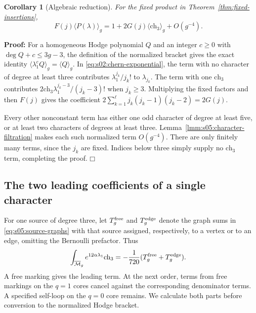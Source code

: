 \documentclass[a4paper,10pt]{article}
\numberwithin{equation}{section}
\newcommand{\MM}{\overline{\mathcal{M}}}
\theoremstyle{paperplain}
\newtheorem{crl}[thm]{Corollary}
\theoremstyle{paperremark}
\theoremstyle{paperplain}
\newenvironment{prf}{\noindent \textbf{Proof: }}{\hfill $\mdlgwhtsquare$\par\addvspace{0.5\baselineskip}}
\begin{document}
\begin{crl}[Algebraic reduction]\label{crl:s05:algebraic-reduction}
For the fixed product in Theorem~\ref{thm:fixed-insertions},
\begin{equation}\label{eq:s05:algebraic-reduction}
 F(j)\langle P(\lambda)\rangle_g
 =1+2G(j)\langle\mathrm{ch}_3\rangle_g+O(g^{-4}).
\end{equation}
\end{crl}
\begin{prf}
For a homogeneous Hodge polynomial $Q$ and an integer $c\geq0$
with $\deg Q+c\leq3g-3$, the definition of the normalized bracket
gives the exact identity
$\langle\lambda_1^c Q\rangle_g=\langle Q\rangle_g$.
In \eqref{eq:s02:chern-exponential}, the term with no character of
degree at least three contributes $\lambda_1^{j_k}/j_k!$ to
$\lambda_{j_k}$. The term with one $\mathrm{ch}_3$ contributes
$2\mathrm{ch}_3\lambda_1^{j_k-3}/(j_k-3)!$ when $j_k\geq3$.
Multiplying the fixed factors and then $F(j)$ gives the coefficient
$2\sum_{k=1}^{\ell}j_k(j_k-1)(j_k-2)=2G(j)$.

Every other nonconstant term has either one odd character of degree
at least five, or at least two characters of degrees at least three.
Lemma~\ref{lmm:s05:character-filtration} makes each such normalized
term $O(g^{-4})$. There are only finitely many terms, since the
$j_k$ are fixed. Indices below three simply supply no
$\mathrm{ch}_3$ term, completing the proof.
\end{prf}

\subsection{The two leading coefficients of a single character}
\label{subsec:s05:02}

For one source of degree three, let $T_g^{\rm free}$ and
$T_g^{\rm edge}$ denote the graph sums in
\eqref{eq:s05:source-graphs} with that source assigned, respectively,
to a vertex or to an edge, omitting the Bernoulli prefactor. Thus
\begin{equation}\label{eq:s05:single-source}
 \int_{\MM_g}e^{12\alpha\lambda_1}\mathrm{ch}_3
       =-\frac1{720}(T_g^{\rm free}+T_g^{\rm edge}).
\end{equation}
A free marking gives the leading term. At the next order, terms
from free markings on the $q=1$ cores cancel against the corresponding
denominator terms.
A specified self-loop on the $q=0$ core remains. We calculate both
parts before conversion to the normalized Hodge bracket.
\end{document}

